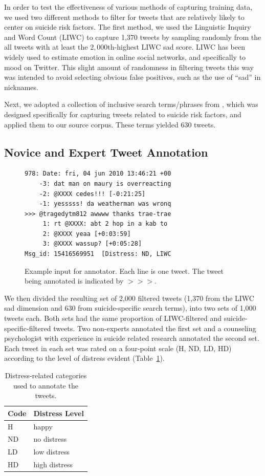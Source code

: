 \documentclass[11pt]{article}
\begin{document}
In order to test the effectiveness of various methods of capturing training data, we used two different methods to filter for tweets that are relatively likely to center on suicide risk factors. The first method, we used the Linguistic Inquiry and Word Count (LIWC) to capture 1,370 tweets by sampling randomly from the all tweets with at least the $2,000$th-highest LIWC sad score. LIWC has been widely used to estimate emotion in online social networks, and specifically to  mood on Twitter. This slight amount of randomness in filtering tweets this way was intended to avoid selecting obvious false positives, such as the use of ``sad'' in nicknames.

Next, we adopted a collection of inclusive search terms/phrases from \cite{Jay}, which was designed specifically for capturing tweets related to suicide risk factors, and applied them to our source corpus. These terms yielded 630 tweets.


\subsection{Novice and Expert Tweet Annotation}
\begin{figure}[h]
  \centering
{\small
\begin{verbatim}
978: Date: fri, 04 jun 2010 13:46:21 +00 
    -3: dat man on maury is overreacting
    -2: @XXXX cedes!!! [-0:21:25]
    -1: yesssss! da weatherman was wronq
>>> @tragedytm812 awwww thanks trae-trae
     1: rt @XXXX: abt 2 hop in a kab to 
     2: @XXXX yeaa [+0:03:59]
     3: @XXXX wassup? [+0:05:28]
Msg_id: 15416569951  [Distress: ND, LIWC
\end{verbatim}}
  \caption{Example input for annotator. Each line is one tweet. The tweet being annotated is indicated by $>>>$.}
  \label{fig:annotateeg}
\end{figure}

We then divided the resulting set of 2,000 filtered tweets (1,370 from the LIWC sad dimension and 630 from suicide-specific search terms), into two sets of 1,000 tweets each. Both sets had the same proportion of LIWC-filtered and suicide-specific-filtered tweets. Two non-experts annotated the first set and a counseling psychologist with experience in suicide related research annotated the second set. Each tweet in each set was rated on a four-point scale (H, ND, LD, HD) according to the level of distress evident (Table~\ref{tab:distress}).


\begin{table}[h]
  \centering
  \begin{tabular}[h]{ll}
   \textbf{Code}&\textbf{Distress Level}\\
\hline
 H & happy \\
ND & no distress\\
 LD & low distress\\
HD &high distress
  \end{tabular}
  \caption{Distress-related categories used to annotate the tweets.}
  \label{tab:distress}
\end{table}
\end{document}
